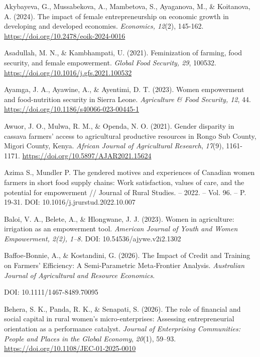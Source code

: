 ﻿\documentclass[sn-mathphys-num]{sn-jnl}
\newcommand{\hl}[1]{#1}
\begin{document}
\hl{Akybayeva, G., Mussabekova, A., Mambetova, S., Ayaganova, M., \&
Koitanova, A. (2024). The impact of female entrepreneurship on economic
growth in developing and developed economies. \emph{Economics, 12}(2),
145-162.}
\href{https://doi.org/10.2478/eoik-2024-0016}{\hl{https://doi.org/10.2478/eoik-2024-0016}}

\hl{Asadullah, M. N., \& Kambhampati, U. (2021). Feminization of
farming, food security, and female empowerment. \emph{Global Food
Security, 29}, 100532.}
\href{https://doi.org/10.1016/j.gfs.2021.100532}{\hl{https://doi.org/10.1016/j.gfs.2021.100532}}

\hl{Ayamga, J. A., Ayawine, A., \& Ayentimi, D. T. (2023). Women
empowerment and food-nutrition security in Sierra Leone.
\emph{Agriculture \& Food Security, 12}, 44.}
\href{https://doi.org/10.1186/s40066-023-00445-1}{\hl{https://doi.org/10.1186/s40066-023-00445-1}}

\hl{Awuor, J. O., Mulwa, R. M., \& Openda, N. O. (2021). Gender
disparity in cassava farmers' access to agricultural productive
resources in Rongo Sub County, Migori County, Kenya. \emph{African
Journal of Agricultural Research}, \emph{17}(9), 1161-1171.}
\href{https://doi.org/10.5897/AJAR2021.15624}{\hl{https://doi.org/10.5897/AJAR2021.15624}}

\hl{Azima S., Mundler P. The gendered motives and experiences of
Canadian women farmers in short food supply chains: Work satisfaction,
values of care, and the potential for empowerment // Journal of Rural
Studies. -- 2022. -- Vol. 96. -- P. 19-31.}
\hl{DOI: 10.1016/j.jrurstud.2022.10.007}

\hl{Baloi, V. A., Belete, A., \& Hlongwane, J. J. (2023). Women in
agriculture: irrigation as an empowerment tool. \emph{American Journal
of Youth and Women Empowerment, 2(2), 1--8.}}
\hl{DOI: 10.54536/ajywe.v2i2.1302}

\hl{Baffoe‐Bonnie, A., \& Kostandini, G. (2026). The Impact of Credit
and Training on Farmers' Efficiency: A Semi‐Parametric Meta‐Frontier
Analysis. \emph{Australian Journal of Agricultural and Resource
Economics}.}

\hl{DOI: 10.1111/1467-8489.70095}

\hl{Behera, S. K., Panda, R. K., \& Senapati, S. (2026). The role of
financial and social capital in rural women's micro-enterprises:
Assessing entrepreneurial orientation as a performance catalyst.
\emph{Journal of Enterprising Communities: People and Places in the
Global Economy}, \emph{20}(1), 59--93.}
\href{https://doi.org/10.1108/JEC-01-2025-0010}{\hl{https://doi.org/10.1108/JEC-01-2025-0010}}
\end{document}
